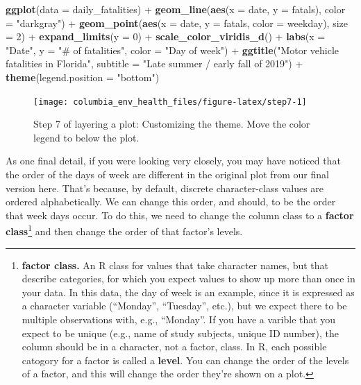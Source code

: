 \documentclass[]{tufte-book}
\newenvironment{Shaded}{}{}
\newcommand{\DataTypeTok}[1]{\textcolor[rgb]{0.56,0.13,0.00}{#1}}
\newcommand{\DecValTok}[1]{\textcolor[rgb]{0.25,0.63,0.44}{#1}}
\newcommand{\KeywordTok}[1]{\textcolor[rgb]{0.00,0.44,0.13}{\textbf{#1}}}
\newcommand{\NormalTok}[1]{#1}
\newcommand{\OperatorTok}[1]{\textcolor[rgb]{0.40,0.40,0.40}{#1}}
\newcommand{\StringTok}[1]{\textcolor[rgb]{0.25,0.44,0.63}{#1}}
\begin{document}
\begin{Shaded}
\begin{Highlighting}[]
\KeywordTok{ggplot}\NormalTok{(}\DataTypeTok{data =}\NormalTok{ daily_fatalities) }\OperatorTok{+}\StringTok{ }\KeywordTok{geom_line}\NormalTok{(}\KeywordTok{aes}\NormalTok{(}\DataTypeTok{x =}\NormalTok{ date, }
    \DataTypeTok{y =}\NormalTok{ fatals), }\DataTypeTok{color =} \StringTok{"darkgray"}\NormalTok{) }\OperatorTok{+}\StringTok{ }\KeywordTok{geom_point}\NormalTok{(}\KeywordTok{aes}\NormalTok{(}\DataTypeTok{x =}\NormalTok{ date, }
    \DataTypeTok{y =}\NormalTok{ fatals, }\DataTypeTok{color =}\NormalTok{ weekday), }\DataTypeTok{size =} \DecValTok{2}\NormalTok{) }\OperatorTok{+}\StringTok{ }
\StringTok{    }\KeywordTok{expand_limits}\NormalTok{(}\DataTypeTok{y =} \DecValTok{0}\NormalTok{) }\OperatorTok{+}\StringTok{ }\KeywordTok{scale_color_viridis_d}\NormalTok{() }\OperatorTok{+}\StringTok{ }
\StringTok{    }\KeywordTok{labs}\NormalTok{(}\DataTypeTok{x =} \StringTok{"Date"}\NormalTok{, }\DataTypeTok{y =} \StringTok{"# of fatalities"}\NormalTok{, }\DataTypeTok{color =} \StringTok{"Day of week"}\NormalTok{) }\OperatorTok{+}\StringTok{ }
\StringTok{    }\KeywordTok{ggtitle}\NormalTok{(}\StringTok{"Motor vehicle fatalities in Florida"}\NormalTok{, }
        \DataTypeTok{subtitle =} \StringTok{"Late summer / early fall of 2019"}\NormalTok{) }\OperatorTok{+}\StringTok{ }
\StringTok{    }\KeywordTok{theme}\NormalTok{(}\DataTypeTok{legend.position =} \StringTok{"bottom"}\NormalTok{)}
\end{Highlighting}
\end{Shaded}

\begin{figure}
\texttt{[image: columbia\_env\_health\_files/figure-latex/step7-1]} \caption[Step 7 of layering a plot]{Step 7 of layering a plot: Customizing the theme. Move the color legend to below the plot.}\label{fig:step7}
\end{figure}

As one final detail, if you were looking very closely, you may have noticed that
the order of the days of week are different in the original plot from our final
version here. That's because, by default, discrete character-class values are
ordered alphabetically. We can change this order, and should, to be the order that
week days occur. To do this, we need to change the column class to a
\textbf{factor class}\footnote{\textbf{factor class.} An R class for values that take character names,
  but that describe categories, for which you expect values to show up more than once
  in your data. In this data, the day of week is an example, since it is expressed
  as a character variable (``Monday'', ``Tuesday'', etc.), but we expect there to be
  multiple observations with, e.g., ``Monday''. If you have a varible that you expect
  to be unique (e.g., name of study subjects, unique ID number), the column should
  be in a character, not a factor, class.
  In R, each possible catogory for a factor is called a \textbf{level}.
  You can change the order of the levels of a factor, and this will change the
  order they're shown on a plot.} and then change the order of that factor's levels.
\end{document}
